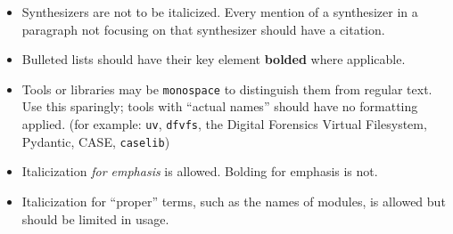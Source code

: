 \begin{itemize}
\item
  Synthesizers are not to be italicized. Every mention of a synthesizer
  in a paragraph not focusing on that synthesizer should have a
  citation.
\item
  Bulleted lists should have their key element \textbf{bolded} where
  applicable.
\item
  Tools or libraries may be \passthrough{\lstinline!monospace!} to
  distinguish them from regular text. Use this sparingly; tools with
  ``actual names'' should have no formatting applied. (for example:
  \passthrough{\lstinline!uv!}, \passthrough{\lstinline!dfvfs!}, the
  Digital Forensics Virtual Filesystem, Pydantic, CASE,
  \passthrough{\lstinline!caselib!})
\item
  Italicization \emph{for emphasis} is allowed. Bolding for emphasis is
  not.
\item
  Italicization for ``proper'' terms, such as the names of modules, is
  allowed but should be limited in usage.
\end{itemize}

